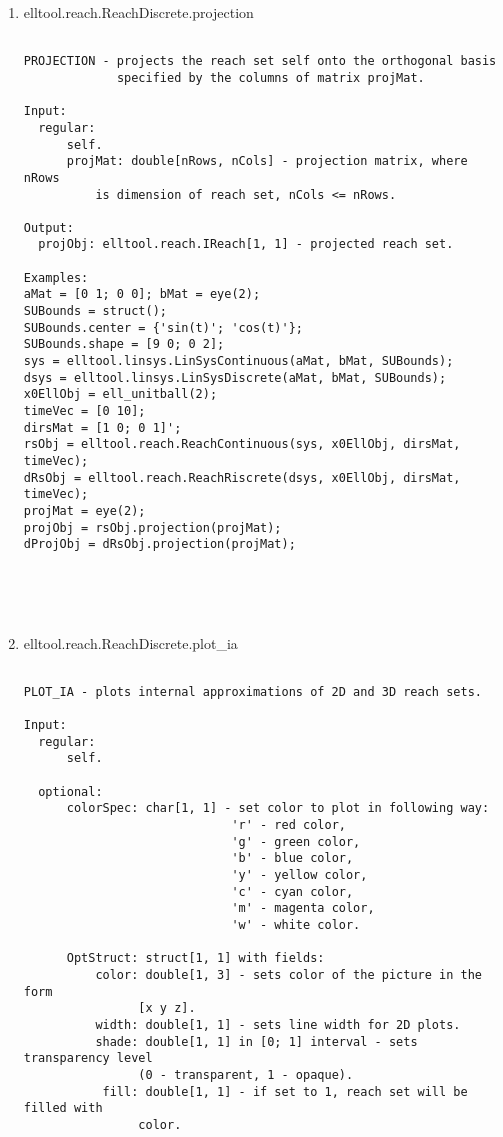 \begin{enumerate}
\begin{lstlisting}
\end{lstlisting}
\fontfamily{\familydefault}
\selectfont
\item {elltool.reach.ReachDiscrete.projection}
\selectfont
\begin{lstlisting}

PROJECTION - projects the reach set self onto the orthogonal basis
             specified by the columns of matrix projMat.

Input:
  regular:
      self.
      projMat: double[nRows, nCols] - projection matrix, where nRows
          is dimension of reach set, nCols <= nRows.

Output:
  projObj: elltool.reach.IReach[1, 1] - projected reach set.

Examples:
aMat = [0 1; 0 0]; bMat = eye(2);
SUBounds = struct();
SUBounds.center = {'sin(t)'; 'cos(t)'};
SUBounds.shape = [9 0; 0 2];
sys = elltool.linsys.LinSysContinuous(aMat, bMat, SUBounds);
dsys = elltool.linsys.LinSysDiscrete(aMat, bMat, SUBounds);
x0EllObj = ell_unitball(2);
timeVec = [0 10];
dirsMat = [1 0; 0 1]';
rsObj = elltool.reach.ReachContinuous(sys, x0EllObj, dirsMat, timeVec);
dRsObj = elltool.reach.ReachRiscrete(dsys, x0EllObj, dirsMat, timeVec);
projMat = eye(2);
projObj = rsObj.projection(projMat);
dProjObj = dRsObj.projection(projMat);





\end{lstlisting}
\fontfamily{\familydefault}
\selectfont
\item {elltool.reach.ReachDiscrete.plot\_ia}
\selectfont
\begin{lstlisting}

PLOT_IA - plots internal approximations of 2D and 3D reach sets.

Input:
  regular:
      self.

  optional:
      colorSpec: char[1, 1] - set color to plot in following way:
                             'r' - red color,
                             'g' - green color,
                             'b' - blue color,
                             'y' - yellow color,
                             'c' - cyan color,
                             'm' - magenta color,
                             'w' - white color.

      OptStruct: struct[1, 1] with fields:
          color: double[1, 3] - sets color of the picture in the form
                [x y z].
          width: double[1, 1] - sets line width for 2D plots.
          shade: double[1, 1] in [0; 1] interval - sets transparency level
                (0 - transparent, 1 - opaque).
           fill: double[1, 1] - if set to 1, reach set will be filled with
                color.


\end{lstlisting}
\end{enumerate}
